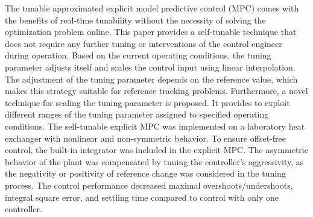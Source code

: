 \documentclass[preprint,12pt]{elsarticle}
\begin{document}
The tunable approximated explicit model predictive control (MPC) comes with the benefits of real-time tunability without the necessity of solving the optimization problem online. This paper provides a self-tunable technique that does not require any further tuning or interventions of the control engineer during operation. Based on the current operating conditions, the tuning parameter adjusts itself and scales the control input using linear interpolation. The adjustment of the tuning parameter depends on the reference value, which makes this strategy suitable for reference tracking problems. Furthermore, a novel technique for scaling the tuning parameter is proposed. It provides to exploit different ranges of the tuning parameter assigned to specified operating conditions. The self-tunable explicit MPC was implemented on a laboratory heat exchanger with nonlinear and non-symmetric behavior. To ensure offset-free control, the built-in integrator was included in the explicit MPC. The asymmetric behavior of the plant was compensated by tuning the controller's aggressivity, as the negativity or positivity of reference change was considered in the tuning process. The control performance decreased maximal overshoots/undershoots, integral square error, and settling time compared to control with only one controller. 
%
%
%
%
%
%
%
\end{document}

